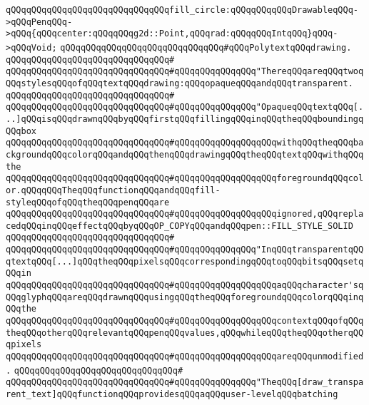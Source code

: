 \verb|qQQqqQQqqQQqqQQqqQQqqQQqqQQqqQQqfill_circle:qQQqqQQqqQQqDrawableqQQq->qQQqPenqQQq->qQQq{qQQqcenter:qQQqqQQqg2d::Point,qQQqrad:qQQqqQQqIntqQQq}qQQq->qQQqVoid;|\newline
\newline
\newline
\verb|qQQqqQQqqQQqqQQqqQQqqQQqqQQqqQQq#qQQqPolytextqQQqdrawing.|\newline
\verb|qQQqqQQqqQQqqQQqqQQqqQQqqQQqqQQq#|\newline
\verb|qQQqqQQqqQQqqQQqqQQqqQQqqQQqqQQq#qQQqqQQqqQQqqQQq"ThereqQQqareqQQqtwoqQQqstylesqQQqofqQQqtextqQQqdrawing:qQQqopaqueqQQqandqQQqtransparent.|\newline
\verb|qQQqqQQqqQQqqQQqqQQqqQQqqQQqqQQq#|\newline
\verb|qQQqqQQqqQQqqQQqqQQqqQQqqQQqqQQq#qQQqqQQqqQQqqQQq"OpaqueqQQqtextqQQq[...]qQQqisqQQqdrawnqQQqbyqQQqfirstqQQqfillingqQQqinqQQqtheqQQqboundingqQQqbox|\newline
\verb|qQQqqQQqqQQqqQQqqQQqqQQqqQQqqQQq#qQQqqQQqqQQqqQQqqQQqwithqQQqtheqQQqbackgroundqQQqcolorqQQqandqQQqthenqQQqdrawingqQQqtheqQQqtextqQQqwithqQQqthe|\newline
\verb|qQQqqQQqqQQqqQQqqQQqqQQqqQQqqQQq#qQQqqQQqqQQqqQQqqQQqforegroundqQQqcolor.qQQqqQQqTheqQQqfunctionqQQqandqQQqfill-styleqQQqofqQQqtheqQQqpenqQQqare|\newline
\verb|qQQqqQQqqQQqqQQqqQQqqQQqqQQqqQQq#qQQqqQQqqQQqqQQqqQQqignored,qQQqreplacedqQQqinqQQqeffectqQQqbyqQQqOP_COPYqQQqandqQQqpen::FILL_STYLE_SOLID|\newline
\verb|qQQqqQQqqQQqqQQqqQQqqQQqqQQqqQQq#|\newline
\verb|qQQqqQQqqQQqqQQqqQQqqQQqqQQqqQQq#qQQqqQQqqQQqqQQq"InqQQqtransparentqQQqtextqQQq[...]qQQqtheqQQqpixelsqQQqcorrespondingqQQqtoqQQqbitsqQQqsetqQQqin|\newline
\verb|qQQqqQQqqQQqqQQqqQQqqQQqqQQqqQQq#qQQqqQQqqQQqqQQqqQQqaqQQqcharacter'sqQQqglyphqQQqareqQQqdrawnqQQqusingqQQqtheqQQqforegroundqQQqcolorqQQqinqQQqthe|\newline
\verb|qQQqqQQqqQQqqQQqqQQqqQQqqQQqqQQq#qQQqqQQqqQQqqQQqqQQqcontextqQQqofqQQqtheqQQqotherqQQqrelevantqQQqpenqQQqvalues,qQQqwhileqQQqtheqQQqotherqQQqpixels|\newline
\verb|qQQqqQQqqQQqqQQqqQQqqQQqqQQqqQQq#qQQqqQQqqQQqqQQqqQQqareqQQqunmodified.|\newline
\verb|qQQqqQQqqQQqqQQqqQQqqQQqqQQqqQQq#|\newline
\verb|qQQqqQQqqQQqqQQqqQQqqQQqqQQqqQQq#qQQqqQQqqQQqqQQq"TheqQQq[draw_transparent_text]qQQqfunctionqQQqprovidesqQQqaqQQquser-levelqQQqbatching|\newline
